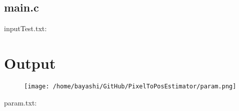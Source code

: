 \subsection{main.c}

\begin{scriptsize}
\begin{ttfamily}

\end{ttfamily}
\end{scriptsize}

inputTest.txt:\\
\begin{scriptsize}
\begin{ttfamily}

\end{ttfamily}
\end{scriptsize}

\section{Output}

\begin{scriptsize}
\begin{ttfamily}

\end{ttfamily}
\end{scriptsize}

\begin{center}
\begin{figure}[H]
\centering\texttt{[image: /home/bayashi/GitHub/PixelToPosEstimator/param.png]}\\
\end{figure}
\end{center}

param.txt:\\
\begin{scriptsize}
\begin{ttfamily}

\end{ttfamily}
\end{scriptsize}


